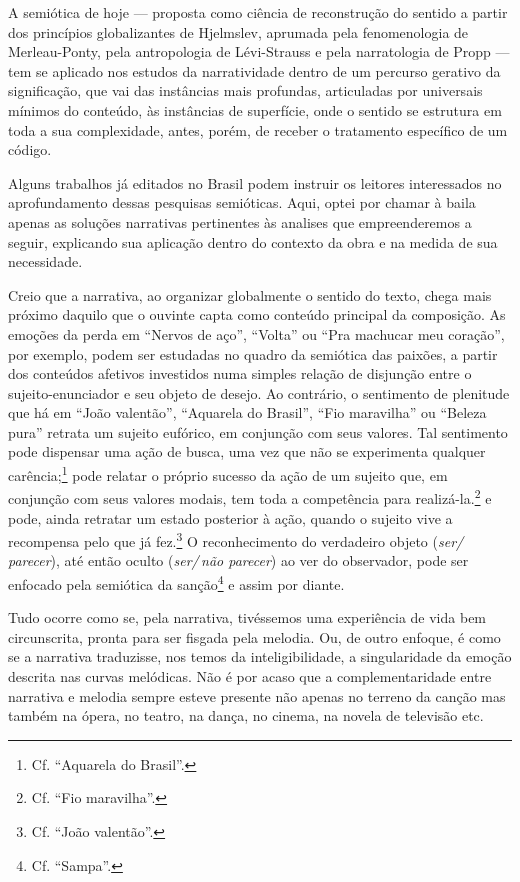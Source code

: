 A semiótica de hoje ---
proposta como ciência de reconstrução do sentido a partir dos princípios
globalizantes de Hjelmslev, aprumada pela fenomenologia de
Merleau-Ponty, pela antropologia de Lévi-Strauss e pela narratologia de
Propp --- tem se aplicado nos estudos da narratividade dentro de um
percurso gerativo da significação, que vai das instâncias mais profundas, articuladas por universais mínimos do conteúdo, às instâncias de
superfície, onde o sentido se estrutura em toda a sua complexidade,
antes, porém, de receber o tratamento específico de um código.

Alguns trabalhos já editados no Brasil podem instruir os leitores
interessados no aprofundamento dessas pesquisas semióticas. Aqui,
optei por chamar à baila apenas as soluções narrativas pertinentes às
analises que empreenderemos a seguir, explicando sua aplicação dentro do
contexto da obra e na medida de sua necessidade.

Creio que a narrativa, ao organizar globalmente o sentido do texto,
chega mais próximo daquilo que o ouvinte capta como conteúdo principal
da composição. As emoções da perda em ``Nervos de aço'', ``Volta'' ou ``Pra
machucar meu coração'', por exemplo, podem ser estudadas no quadro da
semiótica das paixões, a partir dos conteúdos afetivos investidos numa
simples relação de disjunção entre o sujeito-enunciador e seu objeto de
desejo. Ao contrário, o sentimento de plenitude que há em ``João valentão'',
``Aquarela do Brasil'', ``Fio maravilha'' ou ``Beleza pura'' retrata um sujeito
eufórico, em conjunção com seus valores. Tal sentimento pode dispensar
uma ação de busca, uma vez que não se experimenta qualquer carência;\footnote{Cf. ``Aquarela do Brasil''.} pode relatar o próprio sucesso da ação de um
sujeito que, em conjunção com seus valores modais, tem toda a
competência para realizá-la.\footnote{Cf. ``Fio maravilha''.} e pode, ainda retratar
um estado posterior à ação, quando o sujeito vive a recompensa pelo que
já fez.\footnote{Cf. ``João valentão''.} O reconhecimento do verdadeiro objeto
(\textit{ser/\,parecer}), até então oculto (\textit{ser/\,não parecer}) ao ver do observador,
pode ser enfocado pela semiótica da sanção\footnote{Cf. ``Sampa''.} e assim por
diante.

Tudo ocorre como se, pela narrativa, tivéssemos uma experiência de vida
bem circunscrita, pronta para ser fisgada pela melodia. Ou, de outro
enfoque, é como se a narrativa traduzisse, nos temos da
inteligibilidade, a singularidade da emoção descrita nas curvas
melódicas. Não é por acaso que a complementaridade entre narrativa e
melodia sempre esteve presente não apenas no terreno da canção mas
também na ópera, no teatro, na dança, no cinema, na novela de televisão
etc.


